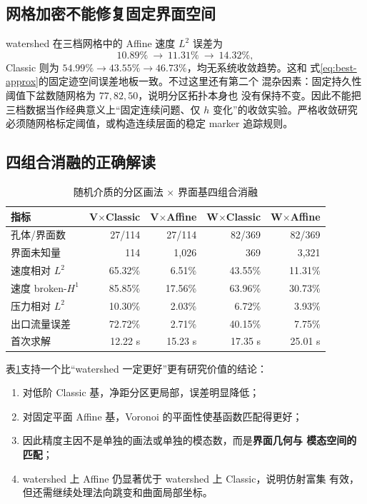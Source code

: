 \documentclass[UTF8,zihao=-4]{ctexart}
\begin{document}
\subsection{网格加密不能修复固定界面空间}

watershed 在三档网格中的 Affine 速度 $L^2$ 误差为
\begin{equation}
  10.89\%\ \longrightarrow\ 11.31\%\ \longrightarrow\ 14.32\%,
\end{equation}
Classic 则为 $54.99\%\to43.55\%\to46.73\%$，均无系统收敛趋势。这和
式\eqref{eq:best-approx}的固定迹空间误差地板一致。不过这里还有第二个
混杂因素：固定持久性阈值下盆数随网格为 $77,82,50$，说明分区拓扑本身也
没有保持不变。因此不能把三档数据当作经典意义上``固定连续问题、仅 $h$
变化''的收敛实验。严格收敛研究必须随网格标定阈值，或构造连续层面的稳定
marker 追踪规则。

\subsection{四组合消融的正确解读}

\begin{table}[htbp]
\centering
\caption{随机介质的分区画法 $\times$ 界面基四组合消融}
\label{tab:four-way}
\small
\begin{tabular}{lrrrr}
\toprule
指标 & V$\times$Classic & V$\times$Affine & W$\times$Classic & W$\times$Affine\\
\midrule
孔体/界面数 & 27/114 & 27/114 & 82/369 & 82/369\\
界面未知量 & 114 & 1,026 & 369 & 3,321\\
速度相对 $L^2$ & 65.32\% & 6.51\% & 43.55\% & 11.31\%\\
速度 broken-$H^1$ & 85.85\% & 17.56\% & 63.96\% & 30.73\%\\
压力相对 $L^2$ & 10.30\% & 2.03\% & 6.72\% & 3.93\%\\
出口流量误差 & 72.72\% & 2.71\% & 40.15\% & 7.75\%\\
首次求解 & 12.22 s & 15.23 s & 17.35 s & 25.01 s\\
\bottomrule
\end{tabular}
\end{table}

表\ref{tab:four-way}支持一个比``watershed 一定更好''更有研究价值的结论：
\begin{enumerate}
  \item 对低阶 Classic 基，净距分区更局部，误差明显降低；
  \item 对固定平面 Affine 基，Voronoi 的平面性使基函数匹配得更好；
  \item 因此精度主因不是单独的画法或单独的模态数，而是\textbf{界面几何与
  模态空间的匹配}；
  \item watershed 上 Affine 仍显著优于 watershed 上 Classic，说明仿射富集
  有效，但还需继续处理法向跳变和曲面局部坐标。
\end{enumerate}
\end{document}
